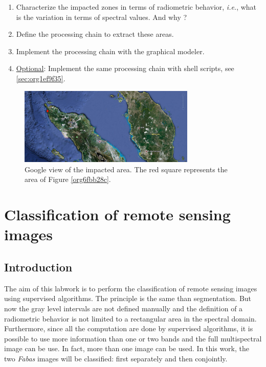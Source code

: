 \documentclass[a4paper,11pt,DIV=18]{scrartcl}
\begin{document}
\begin{work}
\begin{enumerate}
\item Characterize the  impacted zones in terms  of radiometric behavior,
\emph{i.e.}, what is the variation in terms of spectral values. And why ?
\item Define the processing chain to extract these areas.
\item Implement the processing chain with the graphical modeler.
\item \uline{Optional}: Implement  the same processing chain  with shell scripts,
see \ref{sec:org1ef9f35}.
\end{enumerate}
\end{work}

\begin{figure}[htbp]
\centering
\includegraphics[width=0.75\textwidth]{./figures/google_bridge.jpg}
\caption{\label{fig:org2e569df}
Google view of the impacted area. The red square represents the area of Figure \ref{org6fbb28c}.}
\end{figure}

\section{Classification of remote sensing images}
\label{sec:org9cee3eb}
\subsection{Introduction}
\label{sec:org0536a36}
The aim  of this labwork  is to  perform the classification  of remote
sensing images using supervised algorithms.  The principle is the same
than segmentation.  But  now the gray level intervals  are not defined
manually and the  definition of a radiometric behavior  is not limited
to a rectangular area in  the spectral domain.  Furthermore, since all
the computation are  done by supervised algorithms, it  is possible to
use more information than one or  two bands and the full multispectral
image can be use.  In fact, more  than one image can be used.  In this
work, the  two \emph{Fabas} images  will be classified: first  separately and
then conjointly.
\end{document}
